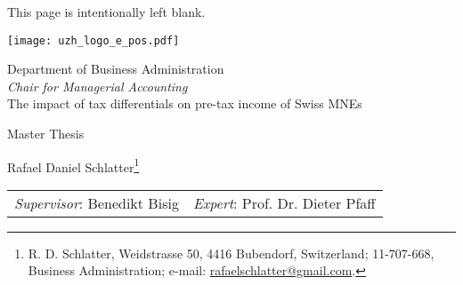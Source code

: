\documentclass[10pt,twocolumn,oneside,cmyk]{article}
\begin{document}
\thispagestyle{empty}
\onecolumn
\vspace*{\fill}
\begin{center}
This page is intentionally left blank.
\end{center}
\clearpage

\begin{titlingpage}
   \onecolumn
    \begin{center}
     \texttt{[image: uzh\_logo\_e\_pos.pdf]} 
     \vspace{2cm}
     
     \large Department of Business Administration\\
     {\textit{Chair for Managerial Accounting}}\\
     \vspace{1cm}
      \begingroup
      \vspace{0cm}
      {\Huge The impact of tax differentials on pre-tax income of Swiss MNEs}
      \vspace{0.5cm}
      
      {\Large Master Thesis}\\
     \endgroup
     \vspace{2cm}
     
     Rafael Daniel Schlatter\footnote{\textit { \Letter} R. D. Schlatter, Weidstrasse 50, 4416 Bubendorf, Switzerland; 11-707-668, Business Administration; e-mail: \href{mailto:rafaelschlatter@gmail.com}{rafaelschlatter@gmail.com}.}
     \vspace{0.5cm}
     
     \begin{tabular}{c c}
      \textit{Supervisor}: Benedikt Bisig &\textit{Expert}: Prof. Dr. Dieter Pfaff\\
     \end{tabular}
     \vspace{0.5cm}
     

\end{center}
\end{titlingpage}
\end{document}
